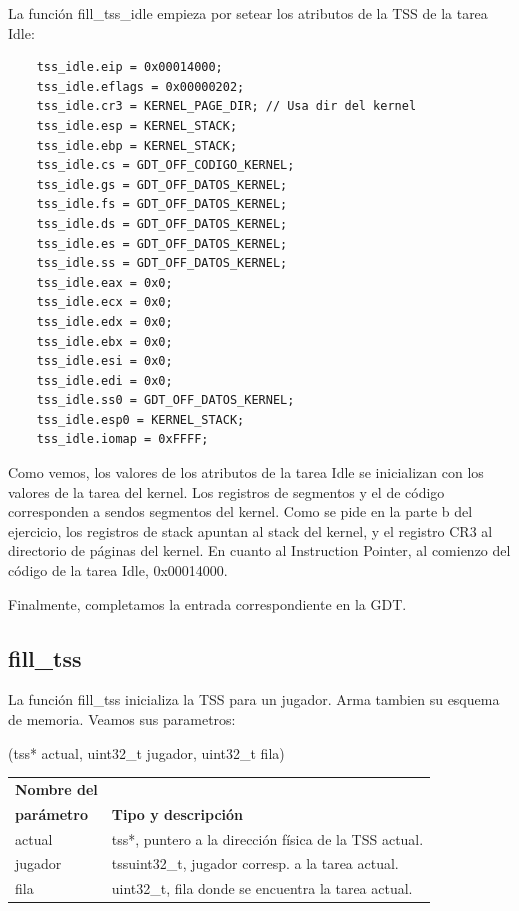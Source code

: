 \documentclass[a4paper]{article}
\newenvironment{codesnippet}{%
	\begin{Sbox}\begin{minipage}{\textwidth}\sffamily\small}%
	{\end{minipage}\end{Sbox}%
		\begin{center}%
		\vspace{-0.4cm}\colorbox{litegrey}{\TheSbox}\end{center}\vspace{0.3cm}}
\begin{document}
La función fill\_tss\_idle empieza por setear los atributos de la TSS de la tarea Idle:

\begin{codesnippet}
  \begin{verbatim}
    tss_idle.eip = 0x00014000;
    tss_idle.eflags = 0x00000202;
    tss_idle.cr3 = KERNEL_PAGE_DIR; // Usa dir del kernel
    tss_idle.esp = KERNEL_STACK;
    tss_idle.ebp = KERNEL_STACK;
    tss_idle.cs = GDT_OFF_CODIGO_KERNEL;
    tss_idle.gs = GDT_OFF_DATOS_KERNEL;
    tss_idle.fs = GDT_OFF_DATOS_KERNEL;
    tss_idle.ds = GDT_OFF_DATOS_KERNEL;
    tss_idle.es = GDT_OFF_DATOS_KERNEL;
    tss_idle.ss = GDT_OFF_DATOS_KERNEL;
    tss_idle.eax = 0x0;
    tss_idle.ecx = 0x0;
    tss_idle.edx = 0x0;
    tss_idle.ebx = 0x0;
    tss_idle.esi = 0x0;
    tss_idle.edi = 0x0;
    tss_idle.ss0 = GDT_OFF_DATOS_KERNEL;
    tss_idle.esp0 = KERNEL_STACK;
    tss_idle.iomap = 0xFFFF;
  \end{verbatim}
\end{codesnippet}

Como vemos, los valores de los atributos de la tarea Idle se inicializan con los valores de la tarea del kernel. Los
registros de segmentos y el de código corresponden a sendos segmentos del kernel. Como se pide en la parte b del
ejercicio, los registros de stack apuntan al stack del kernel, y el registro CR3 al directorio de páginas del kernel. En
cuanto al Instruction Pointer, al comienzo del código de la tarea Idle, 0x00014000.

Finalmente, completamos la entrada correspondiente en la GDT.

\subsection{fill_tss}

La función fill_tss inicializa la TSS para un jugador. Arma tambien su esquema de memoria. Veamos sus parametros:

(tss* actual, uint32_t jugador, uint32_t fila)
\begin{center}
  \label{tab:table4}
  \begin{tabular}{l|l} %
    \textbf{Nombre del} & \\ 
    \textbf{parámetro} &  \textbf{Tipo y descripción}\\
    \hline
    actual & tss*, puntero a la dirección física de la TSS actual.\\
    jugador & tssuint32_t, jugador corresp. a la tarea actual.\\
    fila & uint32_t, fila donde se encuentra la tarea actual.\\
  \end{tabular}
\end{center}
\end{document}
